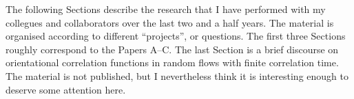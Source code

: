 \documentclass[thesis.tex]{subfiles}
\begin{document}
The following Sections describe the research that I have performed with my collegues and collaborators over the last two and a half years. The material is organised according to different ``projects'', or questions. The first three Sections roughly correspond to the Papers A--C. The last Section is a brief discourse on orientational correlation functions in random flows with finite correlation time. The material is not published, but I nevertheless think it is interesting enough to deserve some attention here.
\end{document}
